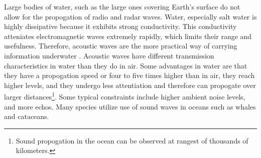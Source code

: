 Large bodies of water, such as the large ones covering Earth's surface do not allow for the propogation of radio and radar waves. Water, especially salt water is highly dissipative because it exhibits strong conductivity. This conductivity atteniates electromagnetic waves extremely rapidly, which limits their range and usefulness. Therefore, acoustic waves are the more practical way of carrying information underwater \cite{bib:An Introduction To Underwater Acoustics}. Acoustic waves have different transmission characteristics in water than they do in air. Some advantages in water are that they have a propogation speed or four to five times higher than in air, they reach higher levels, and they undergo less attentiation and therefore can propogate over larger distances\footnote{Sound propogation in the ocean can be observed at rangest of thousands of kilometers\cite{bib:An Introduction To Underwater Acoustics}.}. Some typical constraints include higher ambient noise levels, and more echos. Many species utilize use of sound waves in oceans such as whales and cataceans. 
